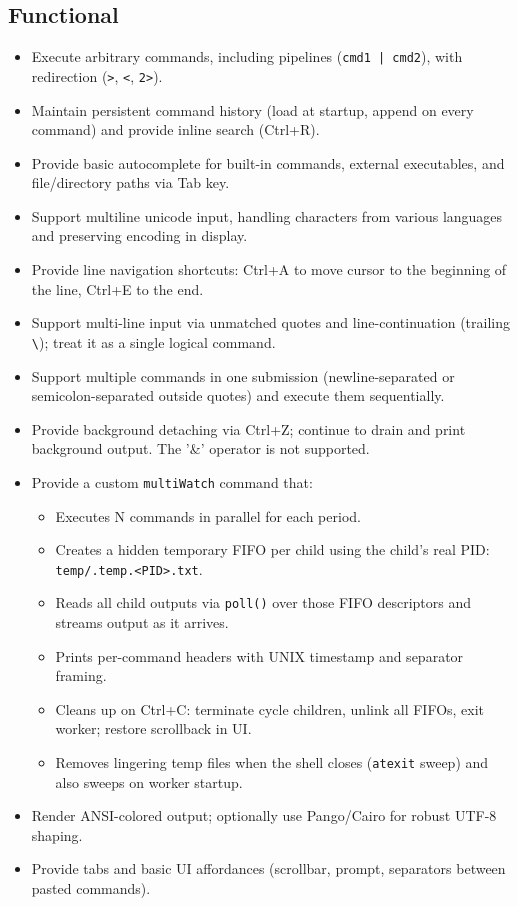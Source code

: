 \documentclass[11pt,a4paper]{article}
\begin{document}
\subsection{Functional}
\begin{itemize}[leftmargin=*]
  \item Execute arbitrary commands, including pipelines (\verb!cmd1 | cmd2!), with redirection (\verb!>!, \verb!<!, \verb!2>!).
  \item Maintain persistent command history (load at startup, append on every command) and provide inline search (Ctrl+R).
  \item Provide basic autocomplete for built-in commands, external executables, and file/directory paths via Tab key.
  \item Support multiline unicode input, handling characters from various languages and preserving encoding in display.
  \item Provide line navigation shortcuts: Ctrl+A to move cursor to the beginning of the line, Ctrl+E to the end.
  \item Support multi-line input via unmatched quotes and line-continuation (trailing \verb!\!); treat it as a single logical command.
  \item Support multiple commands in one submission (newline-separated or semicolon-separated outside quotes) and execute them sequentially.
  \item Provide background detaching via Ctrl+Z; continue to drain and print background output. The '&' operator is not supported.
  \item Provide a custom \texttt{multiWatch} command that:
    \begin{itemize}
      \item Executes N commands in parallel for each period.
      \item Creates a hidden temporary FIFO per child using the child's real PID: \verb!temp/.temp.<PID>.txt!.
      \item Reads all child outputs via \texttt{poll()} over those FIFO descriptors and streams output as it arrives.
      \item Prints per-command headers with UNIX timestamp and separator framing.
      \item Cleans up on Ctrl+C: terminate cycle children, unlink all FIFOs, exit worker; restore scrollback in UI.
      \item Removes lingering temp files when the shell closes (\texttt{atexit} sweep) and also sweeps on worker startup.
    \end{itemize}
  \item Render ANSI-colored output; optionally use Pango/Cairo for robust UTF-8 shaping.
  \item Provide tabs and basic UI affordances (scrollbar, prompt, separators between pasted commands).
\end{itemize}
\end{document}
